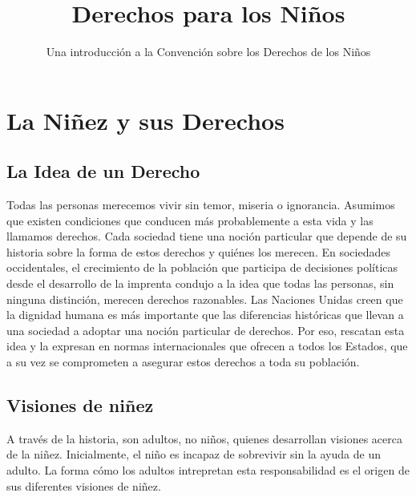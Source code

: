 \documentclass{tufte-handout}
\title{Derechos para los Niños}
\author[]{Una introducción a la Convención sobre los Derechos de los Niños}
\date{} %
\begin{document}
\maketitle%

\bigskip
\bigskip
\bigskip

\section{La Niñez y sus Derechos}\label{sec:ninez_y_derechos}
\subsection{La Idea de un Derecho}\label{subsec:derecho}


Todas las personas merecemos vivir sin temor, miseria o ignorancia. Asumimos que existen condiciones que conducen más probablemente a esta vida y las llamamos derechos. Cada sociedad tiene una noción particular que depende de su historia sobre la forma de estos derechos y quiénes los merecen. En sociedades occidentales, el crecimiento de la población que participa de decisiones políticas desde el desarrollo de la imprenta condujo a la idea que todas las personas, sin ninguna distinción, merecen derechos razonables. Las Naciones Unidas creen que la dignidad humana es más importante que las diferencias históricas que llevan a una sociedad a adoptar una noción particular de derechos. Por eso, rescatan esta idea y la expresan en normas internacionales que ofrecen a todos los Estados, que a su vez se comprometen a asegurar estos derechos a toda su población.


\subsection{Visiones de niñez}\label{subsec:visiones}


A través de la historia, son adultos, no niños, quienes desarrollan visiones acerca de la niñez. Inicialmente, el niño es incapaz de sobrevivir sin la ayuda de un adulto. La forma cómo los adultos intrepretan esta responsabilidad es el origen de sus diferentes visiones de niñez.
\end{document}
